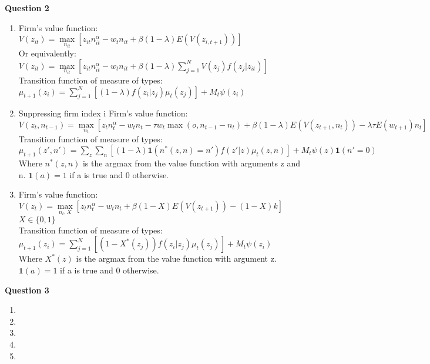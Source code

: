 \documentclass[12pt]{article}
\begin{document}
\begin{onehalfspace}
\textbf{Question 2}
\begin{enumerate}[1.]
    \item 
    Firm's value function:\\
    $V(z_{it}) = \max\limits_{n_{it}}\left[z_{it}n_{it}^\alpha -w_tn_{it} + \beta(1-\lambda) E(V(z_{i,t+1}))\right]$\\
    Or equivalently:\\
    $V(z_{it}) = \max\limits_{n_{it}}\left[z_{it}n_{it}^\alpha -w_tn_{it} + \beta(1-\lambda) \sum\limits_{j=1}^{N}V(z_j)f(z_j|z_{it})\right]$\\
    Transition function of measure of types:\\
    $\mu_{t+1}(z_i) = \sum\limits_{j=1}^{N}\left[(1-\lambda)f(z_i|z_j)\mu_t(z_j)\right] + M_t\psi(z_i)$
    \item
    Suppressing firm index i
    Firm's value function:\\
    $V(z_t, n_{t-1}) = \max\limits_{n_t}\left[z_tn_t^\alpha -w_tn_t -\tau w_t \max(o, n_{t-1}-n_t) + \beta(1-\lambda) E(V(z_{t+1},n_t)) -\lambda \tau E(w_{t+1}) n_t\right]$\\
    Transition function of measure of types:\\
    $\mu_{t+1}(z', n') = \sum\limits_{z}\sum\limits_{n}\left[(1-\lambda)\textbf{1}(n^*(z, n) = n')f(z'|z)\mu_t(z,n)\right] + M_t\psi(z)\textbf{1}(n'=0)$\\
    Where $n^*(z,n)$ is the argmax from the value function with arguments z and n. $\textbf{1}(a) = 1$ if a is true and $0$ otherwise. 
    \item
    Firm's value function:\\
    $V(z_t) = \max\limits_{n_t, X}\left[z_t n_t^\alpha -w_t n_t + \beta(1-X) E(V(z_{t+1})) - (1-X)k\right]$\\
    $X \in \{0,1\}$\\
    Transition function of measure of types:\\
    $\mu_{t+1}(z_i) = \sum\limits_{j=1}^{N}\left[(1-X^*(z_j))f(z_i|z_j)\mu_t(z_j)\right] + M_t\psi(z_i)$\\
    Where $X^*(z)$ is the argmax from the value function with argument z. $\textbf{1}(a) = 1$ if a is true and $0$ otherwise. 
\end{enumerate}

\textbf{Question 3}
\begin{enumerate}[1.]
    \item 
    \item
    \item
    \item
    \item
\end{enumerate}

\end{onehalfspace}
\end{document}
